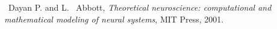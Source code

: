 \documentclass[10pt,journal,compsoc]{IEEEtran}
\begin{document}
% 
%
\begin{thebibliography}{1}

~Dayan P. and L. ~Abbott, \emph{Theoretical neuroscience: computational and
mathematical modeling of neural systems}, \relax MIT Press, 2001.
\end{thebibliography}

%






\end{document}
